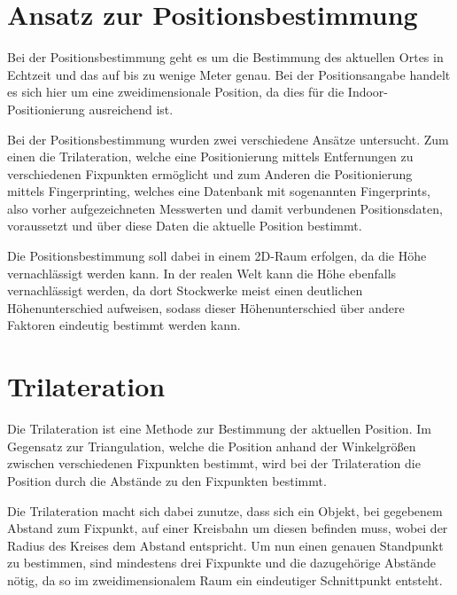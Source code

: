 \section{Ansatz zur Positionsbestimmung}
\label{sec:implementation:positioning}
Bei der Positionsbestimmung geht es um die Bestimmung des aktuellen Ortes in Echtzeit und das auf bis zu wenige Meter genau. Bei der Positionsangabe handelt es sich hier um eine zweidimensionale Position, da dies für die Indoor-Positionierung ausreichend ist.

Bei der Positionsbestimmung wurden zwei verschiedene Ansätze untersucht. Zum einen die Trilateration, welche eine Positionierung mittels Entfernungen zu verschiedenen Fixpunkten ermöglicht und zum Anderen die Positionierung mittels Fingerprinting, welches eine Datenbank mit sogenannten Fingerprints, also vorher aufgezeichneten Messwerten und damit verbundenen Positionsdaten, voraussetzt und über diese Daten die aktuelle Position bestimmt.

Die Positionsbestimmung soll dabei in einem 2D-Raum erfolgen, da die Höhe vernachlässigt werden kann. In der realen Welt kann die Höhe ebenfalls vernachlässigt werden, da dort Stockwerke meist einen deutlichen Höhenunterschied aufweisen, sodass dieser Höhenunterschied über andere Faktoren eindeutig bestimmt werden kann.


\section{Trilateration}
\label{sec:implementation:trilateration}
Die Trilateration ist eine Methode zur Bestimmung der aktuellen Position. Im Gegensatz zur Triangulation, welche die Position anhand der Winkelgrößen zwischen verschiedenen Fixpunkten bestimmt, wird bei der Trilateration die Position durch die Abstände zu den Fixpunkten bestimmt. 

Die Trilateration macht sich dabei zunutze, dass sich ein Objekt, bei gegebenem Abstand zum Fixpunkt, auf einer Kreisbahn um diesen befinden muss, wobei der Radius des Kreises dem Abstand entspricht. Um nun einen genauen Standpunkt zu bestimmen, sind mindestens drei Fixpunkte und die dazugehörige Abstände nötig, da so im zweidimensionalem Raum ein eindeutiger Schnittpunkt entsteht.

